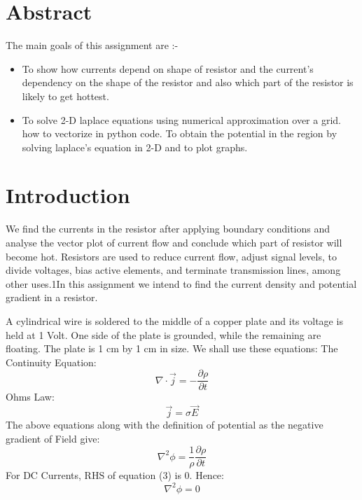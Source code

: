 \documentclass[11pt, a4paper]{article}
\title{\bold{\underline{\textit{\Large{Assignment 5: The Resistor Problem}}}}}
\author{Shailesh Pupalwar [EE20B100]}
\date{March 11, 2021}
\begin{document}
	
		
\maketitle 
\section*{Abstract}
 The main goals of this assignment are :-
  \begin{itemize}
  \item
  	To show how currents depend on shape of resistor and the current's dependency on the shape of
the resistor and also which part of the resistor is likely to get hottest.
  \item
    To solve 2-D laplace equations using numerical approximation over a grid. how to vectorize in python code. To obtain the potential in the region by solving laplace's equation in 2-D and to plot graphs.
\end{itemize}  	
  
  \section{Introduction}
   We find the currents in the resistor after applying boundary conditions and analyse
the vector plot of current flow and conclude which part of resistor will
become hot. Resistors are used to reduce current flow, adjust signal levels, to divide voltages, bias active elements, and terminate transmission lines, among other uses.1In this assignment we intend to find the current density and potential gradient in a resistor.

	A  cylindrical wire is soldered to the middle of a copper plate and its voltage is held at 1 Volt.  One side of the plate is grounded, while the remaining are floating. The plate is 1 cm by 1 cm in size.\newline
We shall use these equations:\newline
The Continuity Equation:
\begin{equation}
    \nabla \cdot \vec{j} = - \frac{\partial\rho}{\partial t}
\end{equation}
Ohms Law:
\begin{equation}
    \vec{j} = \sigma\vec{E}
\end{equation}
The above equations along with the definition of potential as the negative gradient of Field give:
\begin{equation}
    \nabla^2 \phi =  \frac{1}{\rho}\frac{\partial\rho}{\partial t}
\end{equation}
For DC Currents, RHS of equation (3) is 0. Hence:
\begin{equation}
    \nabla^2 \phi =  0
\end{equation}
    
\end{document}

